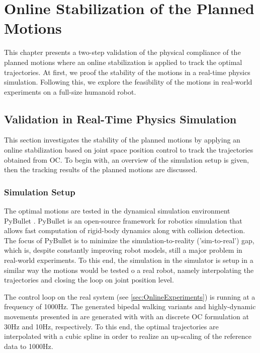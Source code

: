 
\chapter{Online Stabilization of the Planned Motions}\label{c6}
This chapter presents a two-step validation of the physical compliance of the planned motions where an online stabilization is applied to track the optimal trajectories. At first, we proof the stability of the motions in a real-time physics simulation. Following this, we explore the feasibility of the motions in real-world experiments on a full-size humanoid robot.    

\section{Validation in Real-Time Physics Simulation}\label{sec:OnlineSimulation}
This section investigates the stability of the planned motions by applying an online stabilization based on joint space position control to track the trajectories obtained from \gls{OC}. To begin with, an overview of the simulation setup is given, then the tracking results of the planned motions are discussed. 

\subsection{Simulation Setup}
The optimal motions are tested in the dynamical simulation environment PyBullet \cite{coumans2016pybullet}. PyBullet is an open-source framework for robotics simulation that allows fast computation of rigid-body dynamics along with collision detection. The focus of PyBullet is to minimize the simulation-to-reality ('sim-to-real') gap, which is, despite constantly improving robot models, still a major problem in real-world experiments. To this end, the simulation in the simulator is setup in a similar way the motions would be tested o a real robot, namely interpolating the trajectories and closing the loop on joint position level.

The control loop on the real system (see \cref{sec:OnlineExperiments}) is running at a frequency of 1000Hz. The generated bipedal walking variants and highly-dynamic movements presented in  are generated with with an discrete \gls{OC} formulation at 30Hz and 10Hz, respectively. To this end, the optimal trajectories are interpolated with a cubic spline in order to realize an up-scaling of the reference data to 1000Hz.  

